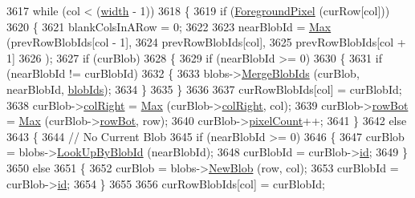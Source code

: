\begin{DoxyCode}
3617     \textcolor{keywordflow}{while}  (col < (\hyperlink{class_k_k_b_1_1_raster_ae0bcc103e191c3421d7692dc69ceb554}{width} - 1))
3618     \{
3619       \textcolor{keywordflow}{if}  (\hyperlink{class_k_k_b_1_1_raster_aa1e1363589e719eb64f0957281b84b6a}{ForegroundPixel} (curRow[col]))
3620       \{
3621         blankColsInARow = 0;
3622 
3623         nearBlobId = \hyperlink{namespace_k_k_b_a25e187e24c091586293725f27f007ad7}{Max} (prevRowBlobIds[col - 1],
3624                           prevRowBlobIds[col],
3625                           prevRowBlobIds[col + 1]
3626                          );
3627         \textcolor{keywordflow}{if}  (curBlob)
3628         \{
3629           \textcolor{keywordflow}{if}  (nearBlobId >= 0)
3630           \{
3631             \textcolor{keywordflow}{if}  (nearBlobId != curBlobId)
3632             \{
3633               blobs->\hyperlink{class_k_k_b_1_1_blob_list_a542ca9592d04a6c7cf1b56127d1c7b4e}{MergeBlobIds} (curBlob, nearBlobId, \hyperlink{class_k_k_b_1_1_raster_a0fc9a1588e809db0b701f0a886bfd18c}{blobIds});
3634             \}
3635           \}
3636 
3637           curRowBlobIds[col] = curBlobId;
3638           curBlob->\hyperlink{class_k_k_b_1_1_blob_a3786c83aeb9b92bc076c14afcc99c463}{colRight}  = \hyperlink{namespace_k_k_b_a25e187e24c091586293725f27f007ad7}{Max} (curBlob->\hyperlink{class_k_k_b_1_1_blob_a3786c83aeb9b92bc076c14afcc99c463}{colRight}, col);
3639           curBlob->\hyperlink{class_k_k_b_1_1_blob_ae6f6816134ac19c54071eca96dd89910}{rowBot}    = \hyperlink{namespace_k_k_b_a25e187e24c091586293725f27f007ad7}{Max} (curBlob->\hyperlink{class_k_k_b_1_1_blob_ae6f6816134ac19c54071eca96dd89910}{rowBot},   row);
3640           curBlob->\hyperlink{class_k_k_b_1_1_blob_a415767d4a364df537d7b2fc06a95721d}{pixelCount}++;
3641         \}
3642         \textcolor{keywordflow}{else}
3643         \{
3644           \textcolor{comment}{// No Current Blob}
3645           \textcolor{keywordflow}{if}  (nearBlobId >= 0)
3646           \{
3647             curBlob   = blobs->\hyperlink{class_k_k_b_1_1_blob_list_a3acd3cdb0c08780511f2087f72749b91}{LookUpByBlobId} (nearBlobId);
3648             curBlobId = curBlob->\hyperlink{class_k_k_b_1_1_blob_af752299192d447637bd6c56d4b1e0660}{id};
3649           \}
3650           \textcolor{keywordflow}{else}
3651           \{
3652             curBlob = blobs->\hyperlink{class_k_k_b_1_1_blob_list_a4542efb8f886b31c58f0a03507d20e69}{NewBlob} (row, col);
3653             curBlobId = curBlob->\hyperlink{class_k_k_b_1_1_blob_af752299192d447637bd6c56d4b1e0660}{id};
3654           \}
3655 
3656           curRowBlobIds[col] = curBlobId;

\end{DoxyCode}
